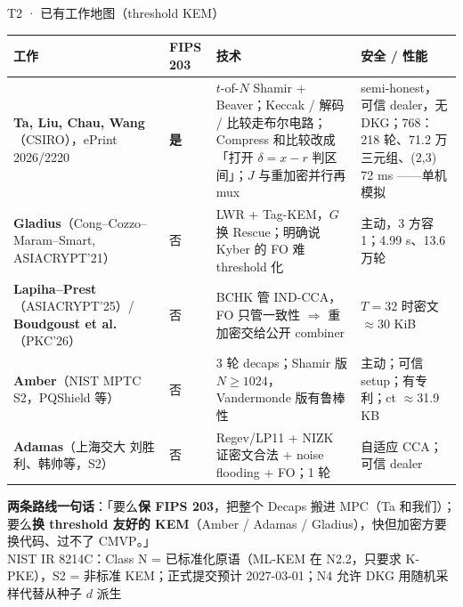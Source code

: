 \documentclass[aspectratio=169,10pt,fontset=none]{ctexbeamer}
\newcommand{\src}[1]{{\scriptsize\color{gray}#1}}
\begin{document}
\begin{frame}{T2 · 已有工作地图（threshold KEM）}
{\scriptsize\renewcommand{\arraystretch}{1.15}
\begin{tabularx}{\textwidth}{@{}p{3.3cm}p{0.9cm}Yp{3.6cm}@{}}\toprule
\textbf{工作} & \textbf{FIPS 203} & \textbf{技术} & \textbf{安全 / 性能} \\\midrule
\textbf{Ta, Liu, Chau, Wang}（CSIRO），ePrint 2026/2220 & \textbf{是} & $t$-of-$N$ Shamir + Beaver；Keccak / 解码 / 比较走布尔电路；Compress 和比较改成「打开 $\delta=x-r$ 判区间」；$J$ 与重加密并行再 mux & semi-honest，可信 dealer，无 DKG；768：218 轮、71.2 万三元组、(2,3) 72 ms ——\alert{单机模拟} \\
\textbf{Gladius}（Cong--Cozzo--Maram--Smart, ASIACRYPT'21）& 否 & LWR + Tag-KEM，$G$ 换 Rescue；明确说 Kyber 的 FO 难 threshold 化 & 主动，3 方容 1；4.99 s、13.6 万轮 \\
\textbf{Lapiha--Prest}（ASIACRYPT'25）/ \textbf{Boudgoust et al.}（PKC'26）& 否 & BCHK 管 IND-CCA，FO 只管一致性 $\Rightarrow$ 重加密交给公开 combiner & $T=32$ 时密文 $\approx$30 KiB \\
\textbf{Amber}（NIST MPTC S2，PQShield 等）& 否 & 3 轮 decaps；Shamir 版 $N\ge1024$，Vandermonde 版有鲁棒性 & 主动；可信 setup；\alert{有专利}；ct $\approx$31.9 KB \\
\textbf{Adamas}（上海交大 刘胜利、韩帅等，S2）& 否 & Regev/LP11 + NIZK 证密文合法 + noise flooding + FO；1 轮 & 自适应 CCA；可信 dealer \\\bottomrule
\end{tabularx}}
\vspace{.3em}

\textbf{两条路线一句话}：「要么\textbf{保 FIPS 203}，把整个 Decaps 搬进 MPC（Ta 和我们）；要么\textbf{换 threshold 友好的 KEM}（Amber / Adamas / Gladius），快但加密方要换代码、过不了 CMVP。」\\
\src{NIST IR 8214C：Class N = 已标准化原语（ML-KEM 在 N2.2，只要求 K-PKE），S2 = 非标准 KEM；正式提交预计 2027-03-01；N4 允许 DKG 用随机采样代替从种子 $d$ 派生}
\end{frame}
\end{document}
